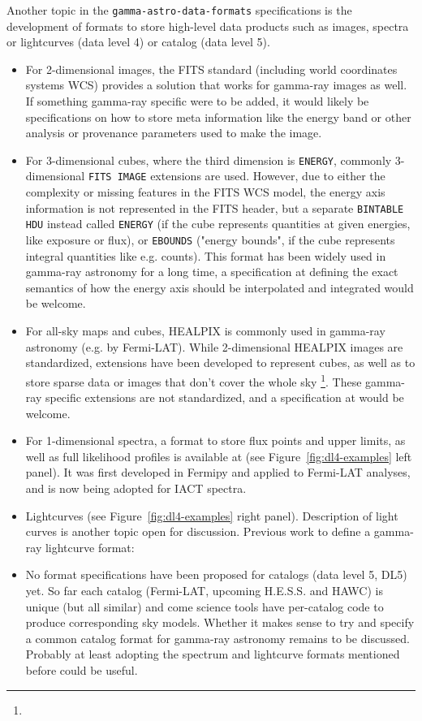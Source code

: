 Another topic in the \texttt{gamma-astro-data-formats} specifications is the development of formats to store high-level data products such as images, spectra or lightcurves (data level 4) or catalog (data level 5).

\begin{itemize}
\item{} For 2-dimensional images, the FITS standard (including world coordinates systems WCS) provides a solution that works for gamma-ray images as well. If something gamma-ray specific were to be added, it would likely be specifications on how to store meta information like the energy band or other analysis or provenance parameters used to make the image.
\item{} For 3-dimensional cubes, where the third dimension is \texttt{ENERGY}, commonly 3-dimensional \texttt{FITS IMAGE} extensions are used. However, due to either the complexity or missing features in the FITS WCS model, the energy axis information is not represented in the FITS header, but a separate \texttt{BINTABLE HDU} instead called \texttt{ENERGY} (if the cube represents quantities at given energies, like exposure or flux), or \texttt{EBOUNDS} ("energy bounds", if the cube represents integral quantities like e.g. counts).
This format has been widely used in gamma-ray astronomy for a long time, a specification at \gadf defining the exact semantics of how the energy axis should be interpolated and integrated would be welcome.
\item{} For all-sky maps and cubes, HEALPIX is commonly used in gamma-ray astronomy (e.g. by Fermi-LAT). While 2-dimensional HEALPIX images are standardized, extensions have been developed to represent cubes, as well as to store sparse data or images that don't cover the whole sky \footnote{\pointlikedata}. These gamma-ray specific extensions are not standardized, and a specification at \gadf would be welcome.
\item{} For 1-dimensional spectra, a format to store flux points and upper limits, as well as full likelihood profiles is available at \gadf (see Figure~\ref{fig:dl4-examples} left panel). It was first developed in Fermipy and applied to Fermi-LAT analyses, and is now being adopted for IACT spectra.
\item{} Lightcurves (see Figure~\ref{fig:dl4-examples} right panel). Description of light curves is another topic open for discussion. Previous work to define a gamma-ray lightcurve format: \cite{2010AnA...524A..48T}
\item{} No format specifications have been proposed for catalogs (data level 5, DL5) yet. So far each catalog (Fermi-LAT, upcoming H.E.S.S. and HAWC) is unique (but all similar) and come science tools have per-catalog code to produce corresponding sky models. Whether it makes sense to try and specify a common catalog format for gamma-ray astronomy remains to be discussed. Probably at least adopting the spectrum and lightcurve formats mentioned before could be useful.
\end{itemize}

